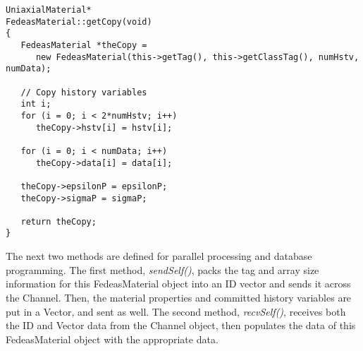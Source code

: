 \documentclass[12pt]{article}
\begin{document}
{\sf\small
\begin{verbatim}
UniaxialMaterial*
FedeasMaterial::getCopy(void)
{
   FedeasMaterial *theCopy = 
      new FedeasMaterial(this->getTag(), this->getClassTag(), numHstv, numData);
     
   // Copy history variables
   int i;
   for (i = 0; i < 2*numHstv; i++)
      theCopy->hstv[i] = hstv[i];
     
   for (i = 0; i < numData; i++)
      theCopy->data[i] = data[i];
     
   theCopy->epsilonP = epsilonP;
   theCopy->sigmaP = sigmaP;
     
   return theCopy;
}
\end{verbatim}
}

\noindent The next two methods are defined for parallel processing and database programming.
The first method, {\em sendSelf()}, packs the tag and array size information for this FedeasMaterial
object into an ID vector and sends it across the Channel. Then, the material properties and 
committed history variables are put in a Vector, and sent as well.
The second method, {\em recvSelf()}, receives both the ID and Vector data from the Channel object, 
then populates the data of this FedeasMaterial object with the appropriate data.
\end{document}
